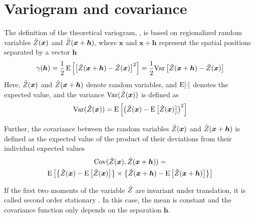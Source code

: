 \documentclass[11pt,a4paper]{amsart}
\begin{document}
\section{Variogram and covariance}
The definition of the theoretical variogram, \variogram{}, is based on
regionalized random variables $\tilde{Z}(\boldsymbol{x})$ and
$\tilde{Z}(\boldsymbol{x}+\boldsymbol{h})$, 
where $\boldsymbol{x}$ and $\boldsymbol{x}+\boldsymbol{h}$ represent the
spatial positions separated by a vector $\boldsymbol{h}$ \cite{bac11:var}
 \begin{align}
   \label{eq:1}
   \gamma(\boldsymbol{h}) = \frac{1}{2}\operatorname{E}
   \left[
   \left[
   \tilde{Z}(\boldsymbol{x}+\boldsymbol{h}) - \tilde{Z}(\boldsymbol{x})
   \right]^2
   \right] = \frac{1}{2} \text{Var}
   \left[
   \tilde{Z}(\boldsymbol{x}+\boldsymbol{h}) - \tilde{Z}(\boldsymbol{x})
   \right]
 \end{align}
Here, $\tilde{Z}(\boldsymbol{x})$ and $\tilde{Z}(\boldsymbol{x} + \boldsymbol{h})$
 denote random variables, and $\operatorname{E}[\cdot]$ denotes the expected
 value, and
the variance $\text{Var}(\tilde{Z}(\boldsymbol{x}))$ is defined as
 \begin{align}
   \label{eq:10}
   \text{Var}(\tilde{Z}(\boldsymbol{x}))= \operatorname{E}
   \left[
   \left(
   \tilde{Z}(\boldsymbol{x}) - \operatorname{E}
   \left[
   \tilde{Z}(\boldsymbol{x})
   \right]
   \right)^2
   \right]
 \end{align}

 Further, the covariance between the random variables $\tilde{Z}(\boldsymbol{x})$ and
$\tilde{Z}(\boldsymbol{x} + \boldsymbol{h})$ is defined as the expected value
of the product of their deviations from their individual expected values
\begin{multline}
  \label{eq:9}
  \operatorname{Cov} (\tilde{Z}(\boldsymbol{x}),\tilde{Z}(\boldsymbol{x} +
  \boldsymbol{h}))=\\
  \operatorname{E}
  \left[
    \left\{
  \tilde{Z}(\boldsymbol{x}) - \operatorname{E}
  \left[
  \tilde{Z}(\boldsymbol{x})
  \right]
\right\} \times
    \left\{
   \tilde{Z}(\boldsymbol{x} + \boldsymbol{h}) - \operatorname{E}
  \left[
  \tilde{Z}(\boldsymbol{x} + \boldsymbol{h})
  \right]
\right\}
  \right]
\end{multline}

If the first two moments of the variable $\tilde{Z}$ are invariant under
translation, it is called second order stationary \cite{chi12:geo}. In this
case, the mean is constant and the covariance function only depends on the
separation $\boldsymbol{h}$.
\end{document}
